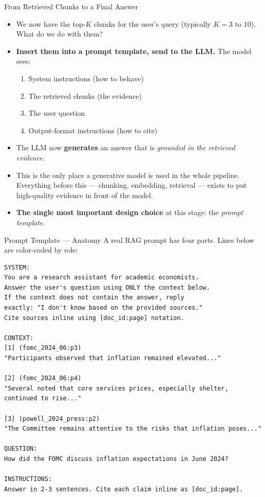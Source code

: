 \documentclass[10pt,english,aspectratio=169]{beamer}
\begin{document}
\begin{frame}{From Retrieved Chunks to a Final Answer}
\begin{itemize}
\item We now have the top-$K$ chunks for the user's query (typically $K = 3$ to $10$). What do we do with them?

\medskip
\item \textbf{Insert them into a prompt template, send to the LLM.} The model sees:
\begin{enumerate}
    \item System instructions (how to behave)
    \item The retrieved chunks (the evidence)
    \item The user question
    \item Output-format instructions (how to cite)
\end{enumerate}

\medskip
\item The LLM now \textbf{generates} an answer that is \emph{grounded in the retrieved evidence}.

\medskip
\item This is the only place a generative model is used in the whole pipeline. Everything before this --- chunking, embedding, retrieval --- exists to put high-quality evidence in front of the model.

\medskip
\item \textbf{The single most important design choice} at this stage: the \emph{prompt template}.
\end{itemize}
\end{frame}

\begin{frame}[fragile]{Prompt Template --- Anatomy}
A real RAG prompt has four parts. Lines below are color-coded by role:
\begin{lstlisting}
SYSTEM:
You are a research assistant for academic economists.
Answer the user's question using ONLY the context below.
If the context does not contain the answer, reply
exactly: "I don't know based on the provided sources."
Cite sources inline using [doc_id:page] notation.

CONTEXT:
[1] (fomc_2024_06:p3)
"Participants observed that inflation remained elevated..."

[2] (fomc_2024_06:p4)
"Several noted that core services prices, especially shelter,
continued to rise..."

[3] (powell_2024_press:p2)
"The Committee remains attentive to the risks that inflation poses..."

QUESTION:
How did the FOMC discuss inflation expectations in June 2024?

INSTRUCTIONS:
Answer in 2-3 sentences. Cite each claim inline as [doc_id:page].
\end{lstlisting}
\end{frame}
\end{document}
